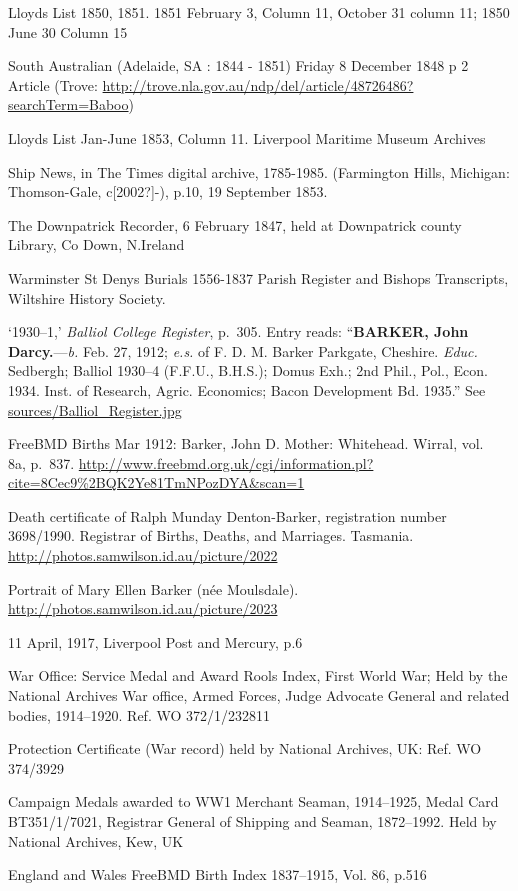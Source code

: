 \begin{thebibliography}{99}
	Lloyds List 1850, 1851. 1851 February 3, Column 11, October 31 column 11; 1850 June 30 Column 15

	South Australian (Adelaide, SA : 1844 - 1851) Friday 8 December 1848 p 2 Article
	(Trove: \url{http://trove.nla.gov.au/ndp/del/article/48726486?searchTerm=Baboo})

	Lloyds List Jan-June 1853, Column 11.  Liverpool Maritime Museum Archives

	Ship News, in The Times digital archive, 1785-1985. (Farmington Hills, Michigan: Thomson-Gale, c[2002?]-), 	p.10, 19 September 1853.

	The Downpatrick Recorder, 6 February 1847, held at Downpatrick county Library, Co Down, N.Ireland

	Warminster St Denys Burials 1556-1837 Parish Register and Bishops Transcripts, Wiltshire History Society.

	`1930--1,' \emph{Balliol College Register}, p.~305. Entry reads:
	``\textbf{BARKER, John Darcy.}---\emph{b.} Feb. 27, 1912; \emph{e.s.} of F. D. M. Barker Parkgate, Cheshire. \emph{Educ.} Sedbergh; Balliol 1930--4 (F.F.U., B.H.S.); Domus Exh.; 2nd Phil., Pol., Econ. 1934. Inst. of Research, Agric. Economics; Bacon Development Bd. 1935.''
	See \url{sources/Balliol_Register.jpg}

	FreeBMD Births Mar 1912: Barker, John D. Mother: Whitehead. Wirral, vol.~ 8a, p.~837.
	\url{http://www.freebmd.org.uk/cgi/information.pl?cite=8Cec9\%2BQK2Ye81TmNPozDYA&scan=1}

	Death certificate of Ralph Munday Denton-Barker, registration number 3698/1990. Registrar of Births, Deaths, and Marriages. Tasmania.
	\url{http://photos.samwilson.id.au/picture/2022}

	Portrait of Mary Ellen Barker (n\'{e}e Moulsdale).
	\url{http://photos.samwilson.id.au/picture/2023}
	
	11 April, 1917, Liverpool Post and Mercury, p.6
	
        War Office: Service Medal and Award Rools Index, First World War; Held by the National Archives War office, 	Armed Forces, Judge Advocate General and related bodies, 1914--1920. Ref. WO 372/1/232811
        
	Protection Certificate (War record) held by National Archives, UK: Ref. WO 374/3929
	
	Campaign Medals awarded to WW1 Merchant Seaman, 1914--1925, Medal Card BT351/1/7021, Registrar General of 
	Shipping and Seaman, 1872--1992. Held by National Archives, Kew, UK
	
	England and Wales FreeBMD Birth Index 1837--1915, Vol. 86, p.516
	

	

\end{thebibliography}
